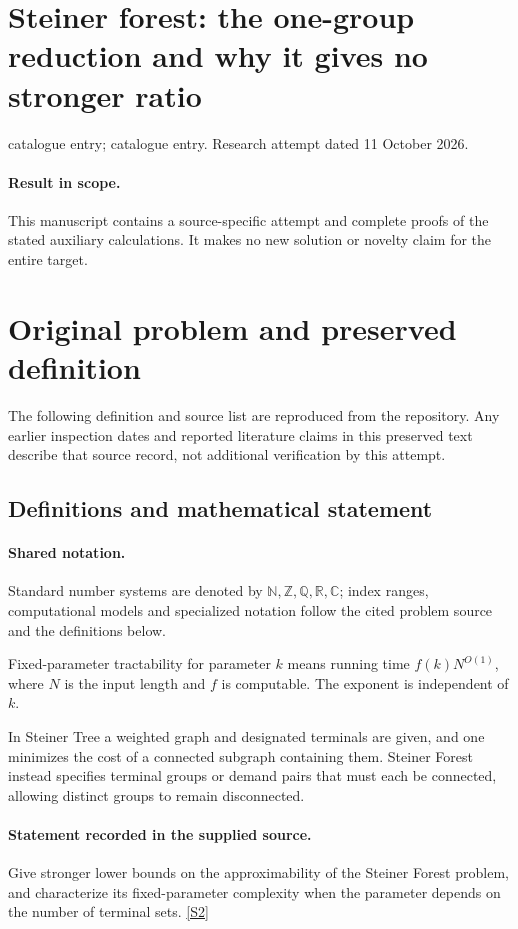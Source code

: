 \documentclass[11pt]{article}
\begin{document}
\section*{Steiner forest: the one-group reduction and why it gives no stronger ratio}
\noindent catalogue entry; catalogue entry. Research attempt dated 11 October 2026.
\paragraph{Result in scope.}This manuscript contains a source-specific attempt and complete proofs of the stated auxiliary calculations. It makes no new solution or novelty claim for the entire target.
\section{Original problem and preserved definition}
The following definition and source list are reproduced from the repository. Any earlier inspection dates and reported literature claims in this preserved text describe that source record, not additional verification by this attempt.
\subsection{Definitions and mathematical statement}

\paragraph{Shared notation.}Standard number systems are denoted by $\mathbb N,\mathbb Z,\mathbb Q,\mathbb R,\mathbb C$; index ranges, computational models and specialized notation follow the cited problem source and the definitions below.


Fixed-parameter tractability for parameter $k$ means running time $f(k)N^{O(1)}$, where $N$ is the input length and $f$ is computable. The exponent is independent of $k$.

In Steiner Tree a weighted graph and designated terminals are given, and one minimizes the cost of a connected subgraph containing them. Steiner Forest instead specifies terminal groups or demand pairs that must each be connected, allowing distinct groups to remain disconnected.
\paragraph{Statement recorded in the supplied source.}
Give stronger lower bounds on the approximability of the Steiner Forest problem, and characterize its fixed-parameter complexity when the parameter depends on the number of terminal sets. \href{https://doi.org/10.4171/owr/2004/28}{[S2]}
\end{document}
